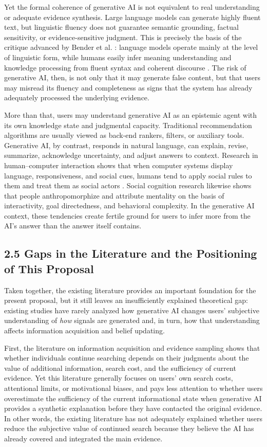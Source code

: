 Yet the formal coherence of generative AI is not equivalent to real understanding or adequate evidence synthesis. Large language models can generate highly fluent text, but linguistic fluency does not guarantee semantic grounding, factual sensitivity, or evidence-sensitive judgment. This is precisely the basis of the critique advanced by Bender et al. \citeyearpar{Bender2021}: language models operate mainly at the level of linguistic form, while humans easily infer meaning understanding and knowledge processing from fluent syntax and coherent discourse \citep{Bender2021}. The risk of generative AI, then, is not only that it may generate false content, but that users may misread its fluency and completeness as signs that the system has already adequately processed the underlying evidence.

More than that, users may understand generative AI as an epistemic agent with its own knowledge state and judgmental capacity. Traditional recommendation algorithms are usually viewed as back-end rankers, filters, or auxiliary tools. Generative AI, by contrast, responds in natural language, can explain, revise, summarize, acknowledge uncertainty, and adjust answers to context. Research in human--computer interaction shows that when computer systems display language, responsiveness, and social cues, humans tend to apply social rules to them and treat them as social actors \citep{ReevesNass1996,NassMoon2000}. Social cognition research likewise shows that people anthropomorphize and attribute mentality on the basis of interactivity, goal directedness, and behavioral complexity. In the generative AI context, these tendencies create fertile ground for users to infer more from the AI's answer than the answer itself contains.

\subsection*{2.5 Gaps in the Literature and the Positioning of This Proposal}

Taken together, the existing literature provides an important foundation for the present proposal, but it still leaves an insufficiently explained theoretical gap: existing studies have rarely analyzed how generative AI changes users' subjective understanding of \emph{how} signals are generated and, in turn, how that understanding affects information acquisition and belief updating.

First, the literature on information acquisition and evidence sampling shows that whether individuals continue searching depends on their judgments about the value of additional information, search cost, and the sufficiency of current evidence. Yet this literature generally focuses on users' own search costs, attentional limits, or motivational biases, and pays less attention to whether users overestimate the sufficiency of the current informational state when generative AI provides a synthetic explanation before they have contacted the original evidence. In other words, the existing literature has not adequately explained whether users reduce the subjective value of continued search because they believe the AI has already covered and integrated the main evidence.

